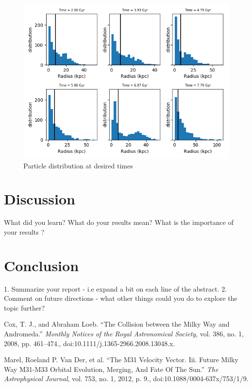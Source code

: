 \documentclass[iop]{emulateapj}
\begin{document}
    \begin{figure}[h]
        \centering
        \includegraphics[width=\columnwidth]{histograms}
        \caption{Particle distribution at desired times}
        \label{fig:separation}
    \end{figure}
    
    

\section{Discussion}

    What did you learn? What do your results mean? What is the importance of your results ?

\section{Conclusion}

    1. Summarize your report - i.e expand a bit on each line of the abstract.
    2. Comment on future directions - what other things could you do to explore the topic further?

\begin{thebibliography}{}

        Cox, T. J., and Abraham Loeb. “The Collision between the Milky Way and Andromeda.” 
        \textit{Monthly Notices of the Royal Astronomical Society}, 
        vol. 386, no. 1, 2008, pp. 461–474., doi:10.1111/j.1365-2966.2008.13048.x.
    
        Marel, Roeland P. Van Der, et al. “The M31 Velocity Vector. Iii. Future Milky Way M31-M33 Orbital Evolution, Merging, And Fate Of The Sun.” 
        \textit{The Astrophysical Journal}, 
        vol. 753, no. 1, 2012, p. 9., doi:10.1088/0004-637x/753/1/9.
    
\end{thebibliography}

\clearpage
\end{document}
